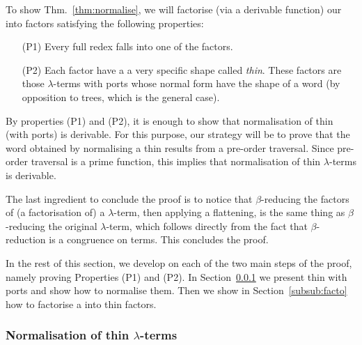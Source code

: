 To show Thm.~\ref{thm:normalise}, we will factorise (via a derivable function) our \lambdaterms into factors satisfying the following properties:
\begin{itemize}
\item[(P1)] Every full redex falls into one of the factors. 
\item[(P2)] Each factor have a a very specific shape called \emph{thin}. These factors are those $\lambda$-terms with ports whose normal form have the shape of a word (by opposition to trees, which is the general case).
\end{itemize}
By properties (P1) and (P2), it is enough to show that normalisation of thin \lambdaterms (with ports) is derivable. For this purpose, our strategy will be to prove that the word obtained by normalising a thin \lambdaterm results from a pre-order traversal. Since pre-order traversal is a prime function,  this implies that normalisation of thin $\lambda$-terms is derivable.
 
 The last ingredient to conclude the proof is to notice that $\beta$-reducing the factors of (a factorisation of) a $\lambda$-term, then applying a flattening, is the same thing as $\beta$-reducing the original $\lambda$-term, which follows directly from the fact that $\beta$-reduction is a congruence on terms. This concludes the proof. 
 
 In the rest of this section, we develop on each of the two main steps of the proof, namely proving Properties (P1) and (P2).  In Section~\ref{subsub:thin} we present thin \lambdaterms with ports and show how to normalise them. Then we show in Section~\ref{subsub:facto} how to factorise a \lambdaterm into thin factors. 
 

\subsubsection{Normalisation of thin $\lambda$-terms}\label{subsub:thin}

